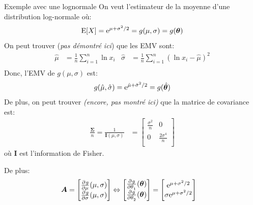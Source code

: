 \documentclass[10pt, french]{article}
\begin{document}
\begin{multicols*}{3}
\begin{examplebox}{Exemple avec une lognormale}
On veut l'estimateur de la moyenne d'une distribution log-normale où:
\begin{equation*}
	\text{E}[X]	=	\e{\mu + \sigma^{2}/2}	=	g(\mu, \sigma)	=	g(\bm\theta)	\\
\end{equation*}
On peut trouver (\textit{pas démontré ici}) que les EMV sont:
\begin{align*}
	\hat{\mu}
	&=	\frac{1}{n} \sum_{i = 1}^{n} \ln x_{i}	&
	\hat{\sigma}
	&=	\frac{1}{n} \sum_{i = 1}^{n} (\ln x_{i} - \hat{\mu})^{2}	\\
\end{align*}
Donc, l'EMV de $g(\mu, \sigma)$ est:
\begin{equation*}
	g(\hat{\mu}, \hat{\sigma})	=	\e{\hat{\mu} + \hat{\sigma}^{2}/2}	=	g(\hat{\bm\theta})	\\
\end{equation*}
De plus, on peut trouver \textit{(encore, pas montré ici)} que la matrice de covariance est:
\begin{align*}
	\frac{\bm\Sigma}{n}
	=	\frac{1}{\bm{I}(\mu, \sigma)}	
	&=	\begin{bmatrix}
			\frac{\sigma^{2}}{n}	&	0						\\
			0					&	\frac{2\sigma^{4}}{n}	\\
		\end{bmatrix}
\end{align*}
où $\bm{I}$ est l'information de Fisher.

De plus:
\begin{align*}
	\bm{A}
	&=
	\begin{bmatrix}
		\deriv{\mu}g(\mu, \sigma)	\\
		\deriv{\sigma}g(\mu, \sigma)	\\
	\end{bmatrix}
	\Leftrightarrow
	\begin{bmatrix}
		\deriv{\theta_{1}}g(\bm\theta)	\\
		\deriv{\theta_{2}}g(\bm\theta)	\\
	\end{bmatrix}
	=
	\begin{bmatrix}
		\e{{\mu} + {\sigma}^{2}/2}	\\
		\sigma\e{{\mu} + {\sigma}^{2}/2}	\\
	\end{bmatrix}
\end{align*}
\setlength{\mathindent}{-1.5cm}


\end{examplebox}
\end{multicols*}
\end{document}
